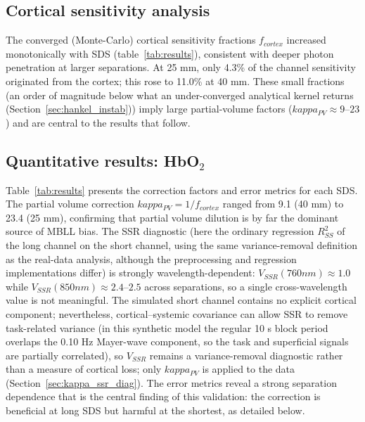 \documentclass[11pt]{article}
\def\kappa{kappa}%
\def\mathrm#1{#1}%
\def\,{ }%
\begin{document}
\subsection{Cortical sensitivity analysis}

The converged (Monte-Carlo) cortical sensitivity fractions $f_{\mathrm{cortex}}$ increased monotonically with SDS (table~\ref{tab:results}), consistent with deeper photon penetration at larger separations\cite{r10,r12}. At 25\,mm, only 4.3\% of the channel sensitivity originated from the cortex; this rose to 11.0\% at 40\,mm. These small fractions (an order of magnitude below what an under-converged analytical kernel returns (Section~\ref{sec:hankel_instab})) imply large partial-volume factors ($\kappa_{\mathrm{PV}} \approx 9$--$23$) and are central to the results that follow.

\subsection{Quantitative results: \texorpdfstring{HbO$_2$}{HbO2}}

Table~\ref{tab:results} presents the correction factors and error metrics for each SDS. The partial volume correction $\kappa_{\mathrm{PV}} = 1/f_{\mathrm{cortex}}$ ranged from 9.1 (40\,mm) to 23.4 (25\,mm), confirming that partial volume dilution is by far the dominant source of MBLL bias. The SSR diagnostic (here the ordinary regression $R^2_{\mathrm{SS}}$ of the long channel on the short channel, using the same variance-removal definition as the real-data analysis, although the preprocessing and regression implementations differ) is strongly wavelength-dependent: $V_{\mathrm{SSR}}(760\,\mathrm{nm}) \approx 1.0$ while $V_{\mathrm{SSR}}(850\,\mathrm{nm}) \approx 2.4$--$2.5$ across separations, so a single cross-wavelength value is not meaningful. The simulated short channel contains no explicit cortical component; nevertheless, cortical--systemic covariance can allow SSR to remove task-related variance (in this synthetic model the regular 10\,s block period overlaps the 0.10\,Hz Mayer-wave component, so the task and superficial signals are partially correlated), so $V_{\mathrm{SSR}}$ remains a variance-removal diagnostic rather than a measure of cortical loss; only $\kappa_{\mathrm{PV}}$ is applied to the data (Section~\ref{sec:kappa_ssr_diag}). The error metrics reveal a strong separation dependence that is the central finding of this validation: the correction is beneficial at long SDS but harmful at the shortest, as detailed below.
\end{document}
